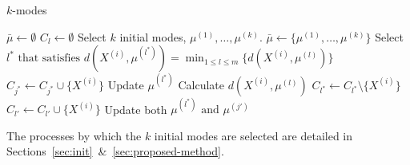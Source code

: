 \begin{algorithm}[H]
    \caption{\(k\)-modes}\label{alg:kmodes}
	\begin{algorithmic}[0] 
        \State \(\bar{\mu} \gets \emptyset\)
            \State \(C_l \gets \emptyset\)
		\EndFor
        \State Select \(k\) initial modes, \(\mu^{(1)}, \ldots, \mu^{(k)}\).
        \State \(\bar{\mu} \gets \{\mu^{(1)}, \ldots, \mu^{(k)}\}\)
            \State Select \(l^* \text{ that satisfies } \displaystyle{d(X^{(i)}, 
                \mu^{(l^*)}) = \min_{1 \le l \le m} \{d(X^{(i)}, \mu^{(l)})\}}\)
            \State \(C_{j^*} \gets C_{j^*} \cup \{X^{(i)}\}\)
            \State Update \(\mu^{(l^*)}\)
		\EndFor
		\Repeat
                    \State Calculate \(d(X^{(i)}, \mu^{(l)})\)
				\EndFor
                    \State \(C_{l^*} \gets C_{l^*} \setminus \{X^{(i)}\}\)
                    \State \(C_{l'} \gets C_{l'} \cup \{X^{(i)}\}\)
                    \State Update both \(\mu^{(l^*)} \text{ and } \mu^{(j')}\)
				\EndIf
			\EndFor
	\end{algorithmic}
\end{algorithm}

\begin{remark}
    The processes by which the \(k\) initial modes are selected are detailed in 
    Sections~\ref{sec:init}~\&~\ref{sec:proposed-method}.
\end{remark}

